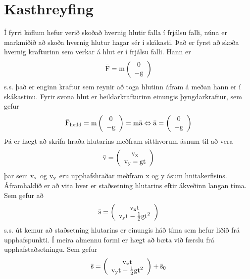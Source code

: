 \chapter{Kasthreyfing}
Í fyrri köflum hefur verið skoðað hvernig hlutir falla í frjálsu falli, núna er markmiðið
að skoða hvernig hlutur hagar sér í skákasti. Það er fyrst að skoða hvernig krafturinn
sem verkar á hlut er í frjálsu falli. Hann er
\[
	\bar{\textrm{F}} 
		= 
		\textrm{m}
		\left( 
			\begin{array}{c}
				0 \\
				- \textrm{g} \\
			\end{array}
		\right)
\]
s.s. það er enginn kraftur sem reynir að toga hlutinn áfram á meðan hann er í skákastinu.
Fyrir svona hlut er heildarkrafturinn einungis þyngdarkraftur, sem gefur
\[
	\bar{\textrm{F}}_\text{heild}
		= 
		\textrm{m}
		\left( 
			\begin{array}{c}
				0 \\
				- \textrm{g} \\
			\end{array}
		\right)
		=
		\textrm{m}
		\bar{\textrm{a}}
	\Leftrightarrow
	\bar{\textrm{a}}
		= 
		\left( 
			\begin{array}{c}
				0 \\
				- \textrm{g} \\
			\end{array}
		\right)
\]
Þá er hægt að skrifa hraða hlutarins meðfram sitthvorum ásnum til að vera
\[
	\bar{\textrm{v}} 
		= 
		\left( 
			\begin{array}{c}
				\textrm{v}_\text{x} \\
				\textrm{v}_\text{y} - \textrm{g} \textrm{t} \\
			\end{array}
		\right)
\]
þar sem $\textrm{v}_\text{x}$ og $\textrm{v}_\text{y}$ eru upphafshraðar meðfram x og y ásum
hnitakerfisins. Áframhaldið er að vita hver er staðsetning hlutarins eftir ákveðinn
langan tíma. Sem gefur að
\[
	\bar{\textrm{s}} 
		= 
		\left( 
			\begin{array}{c}
				\textrm{v}_\text{x} \textrm{t} \\
				\textrm{v}_\text{y} \textrm{t} - \frac{1}{2} \textrm{g} \textrm{t}^2 \\
			\end{array}
		\right)
\]
s.s. út kemur að staðsetning hlutarins er einungis háð tíma
sem hefur liðið frá upphafspunkti. Í meira almennu formi er hægt að bæta við færslu
frá upphafstaðsetningu. Sem gefur
\begin{align}
	\bar{\textrm{s}} 
		= 
		\left( 
			\begin{array}{c}
				\textrm{v}_\text{x} \textrm{t} \\
				\textrm{v}_\text{y} \textrm{t} - \frac{1}{2} \textrm{g} \textrm{t}^2 \\
			\end{array}
		\right)
	+
	\bar{\textrm{s}}_0
\end{align}
